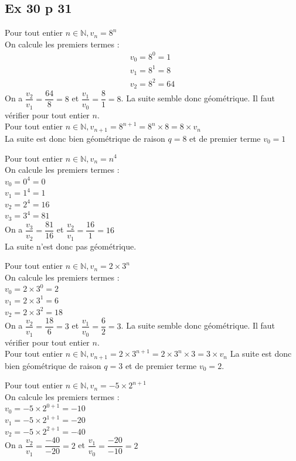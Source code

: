 \documentclass[a4paper,french]{book}
\begin{document}
\subsection*{Ex 30 p 31}
\begin{enumMet}
    \item Pour tout entier $n \in \mathbb{N}, v_{n}=8^{n}$\\ 
    On calcule les premiers termes :
    $$
    \begin{array}{l}
    v_{0}=8^{0}=1 \\
    v_{1}=8^{1}=8 \\
    v_{2}=8^{2}=64
    \end{array}
    $$
    On a $\dfrac{v_{2}}{v_{1}}=\dfrac{64}{8}=8$ et $ \dfrac{v_{1}}{v_{0}}=\dfrac{8}{1}=8$. La suite semble donc géométrique. Il faut vérifier pour tout entier $n$.\\
    Pour tout entier $n \in \mathbb{N}, v_{n+1}=8^{n+1}=8^{n} \times 8=8 \times v_{n}$\\
    La suite est donc bien géométrique de raison $q=8$ et de premier terme $v_{0}=1$
    \item Pour tout entier $n \in \mathbb{N}, v_{n}=n^{4}$\\ 
    On calcule les premiers termes :\\
    $v_{0}=0^{4}=0$\\
    $v_{1}=1^{4}=1$\\
    $v_{2}=2^{4}=16$\\
    $v_{3}=3^{4}=81$\\
    On a $\dfrac{v_{3}}{v_{2}}=\dfrac{81}{16}$ et $\dfrac{v_{2}}{v_{1}}=\dfrac{16}{1}=16$\\
    La suite n'est donc pas géométrique.
    \item Pour tout entier $n \in \mathbb{N}, v_{n}=2 \times 3^{n}$\\
    On calcule les premiers termes :\\
    $v_{0}=2 \times 3^{0}=2$\\
    $v_{1}=2 \times 3^{1}=6$\\
    $v_{2}=2 \times 3^{2}=18$\\
    On a $\dfrac{v_{2}}{v_{1}}=\dfrac{18}{6}=3$ et $ \dfrac{v_{1}}{v_{0}}=\dfrac{6}{2}=3$. La suite semble donc géométrique. Il faut vérifier pour tout entier $n .$\\
    Pour tout entier $n \in \mathbb{N}, v_{n+1}=2 \times 3^{n+1}=2 \times 3^{n} \times 3=3 \times v_{n}$
    La suite est donc bien géométrique de raison $q=3$ et de premier terme $v_{0}=2$.
    \item Pour tout entier $n \in \mathbb{N}, v_{n}=-5 \times 2^{n+1}$\\
    On calcule les premiers termes : \\
    $v_{0}=-5 \times 2^{0+1}=-10$\\
    $v_{1}=-5 \times 2^{1+1}=-20$ \\
    $v_{2}=-5 \times 2^{2+1}=-40$ \\
    On a $\dfrac{v_{2}}{v_{1}}=\dfrac{-40}{-20}=2$ et $\dfrac{v_{1}}{v_{0}}=\dfrac{-20}{-10}=2$
    

\end{enumMet}
\end{document}
